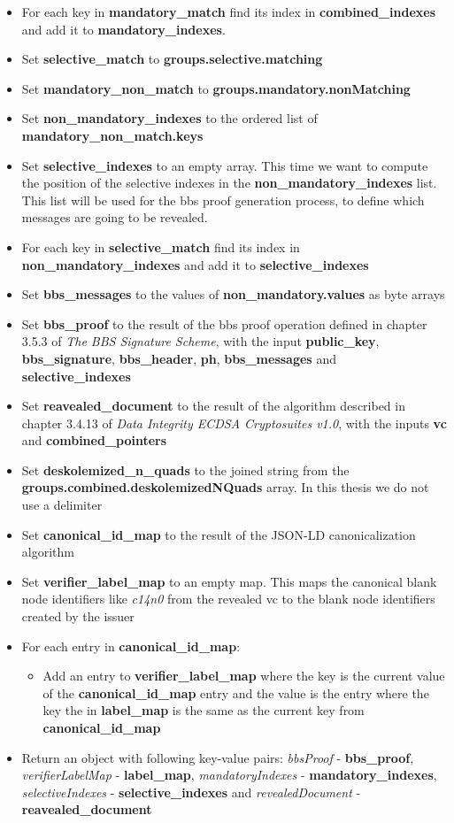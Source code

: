 \documentclass[
	a4paper               %
	,bibliography=totoc   %
	,listof=totoc         %
	,monolingual
	twoside=false,
]{bfhthesis}              %
\begin{document}
\begin{itemize}
	\item For each key in \textbf{mandatory\_match} find its index in \textbf{combined\_indexes} and add it to \textbf{mandatory\_indexes}.
	\item Set \textbf{selective\_match} to \textbf{groups.selective.matching}
	\item Set \textbf{mandatory\_non\_match} to \textbf{groups.mandatory.nonMatching}
	\item Set \textbf{non\_mandatory\_indexes} to the ordered list of \textbf{mandatory\_non\_match.keys}
	\item Set \textbf{selective\_indexes} to an empty array. This time we want to compute the position of the selective indexes in the \textbf{non\_mandatory\_indexes} list. This list will be used for the bbs proof generation process, to define which messages are going to be revealed.
	\item For each key in \textbf{selective\_match} find its index in \textbf{non\_mandatory\_indexes} and add it to \textbf{selective\_indexes}
	\item Set \textbf{bbs\_messages} to the values of \textbf{non\_mandatory.values} as byte arrays
	\item Set \textbf{bbs\_proof} to the result of the bbs proof operation defined in chapter 3.5.3 of \textit{The BBS Signature Scheme}\cite{bbs-signature-scheme}, with the input \textbf{public\_key}, \textbf{bbs\_signature}, \textbf{bbs\_header}, \textbf{ph}, \textbf{bbs\_messages} and \textbf{selective\_indexes}
	\item Set \textbf{reavealed\_document} to the result of the algorithm described in chapter 3.4.13 of \textit{Data Integrity ECDSA Cryptosuites v1.0}\cite{ecdsa}, with the inputs \textbf{vc} and \textbf{combined\_pointers}
	\item Set \textbf{deskolemized\_n\_quads} to the joined string from the \textbf{groups.combined.deskolemizedNQuads} array. In this thesis we do not use a delimiter
	\item Set \textbf{canonical\_id\_map} to the result of the JSON-LD canonicalization algorithm
	\item Set \textbf{verifier\_label\_map} to an empty map. This maps the canonical blank node identifiers like \textit{c14n0} from the revealed vc to the blank node identifiers created by the issuer
	\item For each entry in \textbf{canonical\_id\_map}:
	\begin{itemize}
		\item Add an entry to \textbf{verifier\_label\_map} where the key is the current value of the \textbf{canonical\_id\_map} entry and the value is the entry where the key the in \textbf{label\_map} is the same as the current key from \textbf{canonical\_id\_map}
	\end{itemize}
	\item Return an object with following key-value pairs: \textit{bbsProof} - \textbf{bbs\_proof}, \textit{verifierLabelMap} - \textbf{label\_map}, \textit{mandatoryIndexes} - \textbf{mandatory\_indexes}, \textit{selectiveIndexes} - \textbf{selective\_indexes} and \textit{revealedDocument} - \textbf{reavealed\_document}
\end{itemize}
\end{document}
